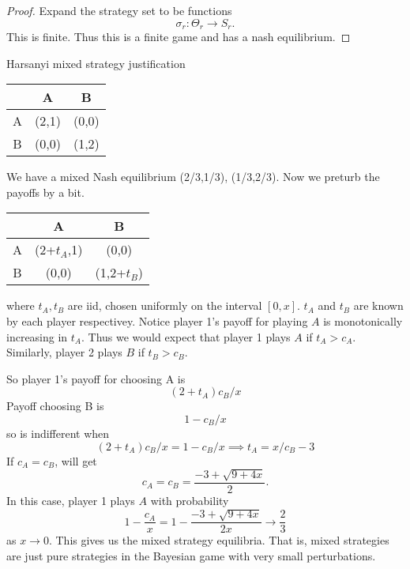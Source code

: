 \begin{proof}
    Expand the strategy set to be functions \[
    \sigma_r:\Theta_r\to S_r.
    \]
    This is finite. Thus this is a finite game and has a nash equilibrium.
\end{proof}
 

\begin{aexample}{Harsanyi mixed strategy justification}{}
    \begin{center}
        \begin{tabular}{|c|c c|}
            \hline  & A & B  \\
            \hline 
            A & (2,1) & (0,0)\\
            \hline
             B & (0,0) & (1,2)\\\hline
        \end{tabular} 
    \end{center}
    We have a mixed Nash equilibrium (2/3,1/3), (1/3,2/3).
    Now we preturb the payoffs by a bit.
    \begin{center}
        \begin{tabular}{|c|c c|}
            \hline  & A & B  \\
            \hline 
            A & (2+$t_A$,1) & (0,0)\\
            \hline
             B & (0,0) & (1,2+$t_B$)\\\hline
        \end{tabular} 
    \end{center}
    where $t_A,t_B$ are iid, chosen uniformly on the interval $[0,x]$. $t_A$ and $t_B$ are known by each player respectivey.
    Notice player 1's payoff for playing $A$ is monotonically increasing in $t_A$. Thus we would expect that player 1 plays $A$ if $t_A>c_A$. Similarly, player 2 plays $B$ if $t_B>c_B$.
    
    So player 1's payoff for choosing A is \[
    (2+t_A)c_B/x
    \]
    Payoff choosing B is\[
    1-c_B/x
    \]
    so is indifferent when \[
        (2+t_A)c_B/x=1-c_B/x\implies t_A = x/c_B-3
    \]
    If $c_A=c_B$, will get \[
    c_A=c_B=\frac{-3+\sqrt{9+4x}}{2}.
    \]
    In this case, player 1 plays $A$ with probability \[
    1-\frac{c_A}{x} = 1-\frac{-3+\sqrt{9+4x}}{2x} \to \frac{2}{3} 
    \]as 
    $x\to 0$. This gives us the mixed strategy equilibria. That is, mixed strategies are just pure strategies in the Bayesian game with very small perturbations.
\end{aexample}